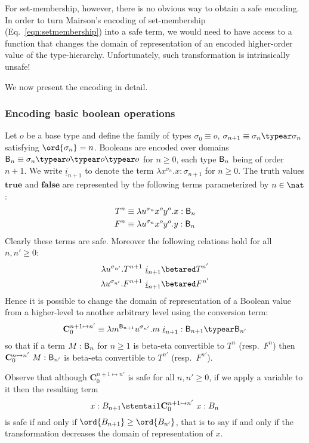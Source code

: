 For set-membership, however, there is no obvious way to obtain a safe encoding. In order to turn Mairson's encoding of set-membership (Eq.\ \ref{eqn:setmembership}) into a safe term, we would need to have access to a function that changes the domain of representation of an encoded higher-order value of the type-hierarchy. Unfortunately, such transformation is intrinsically unsafe!
\smallskip

We now present the encoding in detail.

\subsubsection{Encoding basic boolean operations}

Let $o$ be a base type and define the family of types $\sigma_0
\equiv o$, $\sigma_{n+1} \equiv \sigma_n\typear\sigma_n$ satisfying
$\ord{\sigma_n} = n$. Booleans are encoded over domains $\booltype_n
\equiv \sigma_n\typear o\typear o\typear o$ for $n\geq0$, each type
$\mathsf{B}_n$ being of order $n+1$. We write $\underline{i}_{n+1}$
to denote the term $\lambda x^{\sigma_n}.x : \sigma_{n+1}$ for
$n\geq0$. The truth values $\mathbf{true}$ and $\mathbf{false}$ are
represented by the following terms parameterized by $n \in \nat$:
\begin{align*}
  T^n &\equiv \lambda u^{\sigma_n} x^o y^o .x : \mathsf{B}_{n}\\
  F^n &\equiv \lambda u^{\sigma_n} x^o y^o .y : \mathsf{B}_{n}
\end{align*}
Clearly these terms are safe. Moreover the following relations hold
for all $n,n'\geq 0$:
\begin{align*}
  \lambda u^{\sigma_{n'}} . T^{n+1}~\underline{i}_{n+1}  &\betared  T^{n'} \\
  \lambda u^{\sigma_{n'}} . F^{n+1}~\underline{i}_{n+1}  &\betared  F^{n'}
\end{align*}
Hence it is possible to change the domain of representation of a Boolean value from a higher-level to another arbitrary level using the conversion term:
$$ \mathbf{C}^{n+1\mapsto n'}_0 \equiv \lambda m^{\booltype_{n+1}} u^{\sigma_{n'}}. m~\underline{i}_{n+1} : \booltype_{n+1} \typear \booltype_{n'}$$
so that if a term $M : \mathsf{B}_n$ for $n\geq1$ is beta-eta convertible to $T^n$ (resp.\ $F^n$) then $\mathbf{C}^{n\mapsto n'}_0~M :\mathsf{B}_{n'}$ is beta-eta convertible to $T^{n'}$ (resp.\ $F^{n'}$).

Observe that although $\mathbf{C}^{n+1\mapsto n'}_0$ is safe for all $n,n'\geq 0$, if we apply a variable to it then the resulting term
$$ x:B_{n+1} \stentail \mathbf{C}_0^{n+1\mapsto n'}~x : B_{n}$$
is safe if and only if $\ord{B_{n+1}}\geq\ord{B_{n'}}$, that is to say if and only if the transformation decreases the domain of representation of $x$.


